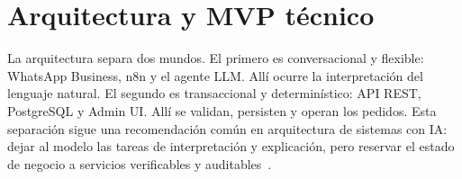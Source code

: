 \section{Arquitectura y MVP técnico}%
\label{sec:arquitectura-mvp}%

La arquitectura separa dos mundos. El primero es conversacional y flexible: WhatsApp Business, n8n y el agente LLM\@. Allí ocurre la interpretación del lenguaje natural. El segundo es transaccional y determinístico: API REST, PostgreSQL y Admin UI\@. Allí se validan, persisten y operan los pedidos. Esta separación sigue una recomendación común en arquitectura de sistemas con \mbox{IA}: dejar al modelo las tareas de interpretación y explicación, pero reservar el estado de negocio a servicios verificables y auditables~\cite{newman2021,hohpe2003}.

